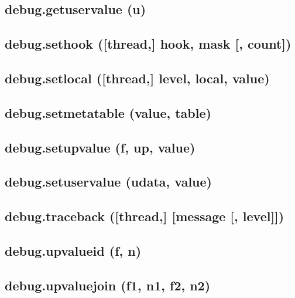 \documentclass[12pt]{article}
\begin{document}
\subsection{debug.getuservalue (u)}

\subsection{debug.sethook ([thread,] hook, mask [, count])}

\subsection{debug.setlocal ([thread,] level, local, value)}

\subsection{debug.setmetatable (value, table)}

\subsection{debug.setupvalue (f, up, value)}

\subsection{debug.setuservalue (udata, value)}

\subsection{debug.traceback ([thread,] [message [, level]])}

\subsection{debug.upvalueid (f, n)}

\subsection{debug.upvaluejoin (f1, n1, f2, n2)}
\end{document}

